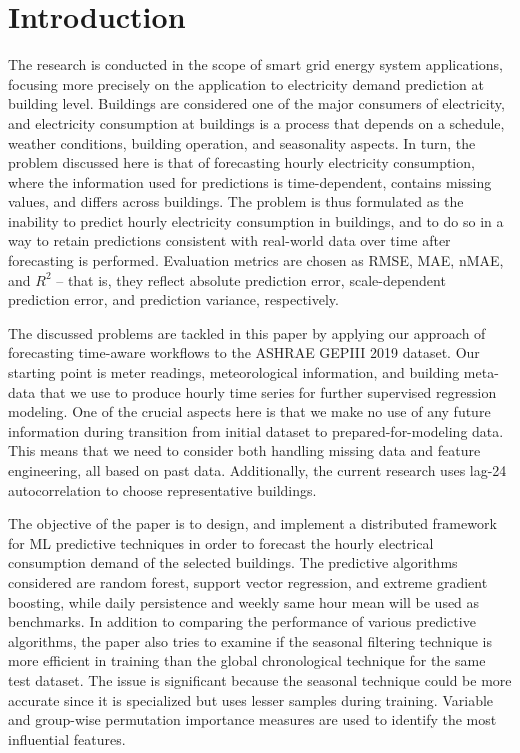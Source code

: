 \documentclass[conference]{IEEEtran}
\begin{document}
\section{Introduction}

The research is conducted in the scope of smart grid energy system applications, focusing more precisely on the application to electricity demand prediction at building level. Buildings are considered one of the major consumers of electricity, and electricity consumption at buildings is a process that depends on a schedule, weather conditions, building operation, and seasonality aspects. In turn, the problem discussed here is that of forecasting hourly electricity consumption, where the information used for predictions is time-dependent, contains missing values, and differs across buildings. The problem is thus formulated as the inability to predict hourly electricity consumption in buildings, and to do so in a way to retain predictions consistent with real-world data over time after forecasting is performed. Evaluation metrics are chosen as RMSE, MAE, nMAE, and $R^2$ – that is, they reflect absolute prediction error, scale-dependent prediction error, and prediction variance, respectively.

The discussed problems are tackled in this paper by applying our approach of forecasting time-aware workflows to the ASHRAE GEPIII 2019 dataset. Our starting point is meter readings, meteorological information, and building meta-data that we use to produce hourly time series for further supervised regression modeling. One of the crucial aspects here is that we make no use of any future information during transition from initial dataset to prepared-for-modeling data. This means that we need to consider both handling missing data and feature engineering, all based on past data. Additionally, the current research uses lag-24 autocorrelation to choose representative buildings.

The objective of the paper is to design, and implement a distributed framework for ML predictive techniques in order to forecast the hourly electrical consumption demand of the selected buildings. The predictive algorithms considered are random forest, support vector regression, and extreme gradient boosting, while daily persistence and weekly same hour mean will be used as benchmarks. In addition to comparing the performance of various predictive algorithms, the paper also tries to examine if the seasonal filtering technique is more efficient in training than the global chronological technique for the same test dataset. The issue is significant because the seasonal technique could be more accurate since it is specialized but uses lesser samples during training. Variable and group-wise permutation importance measures are used to identify the most influential features.
\end{document}
